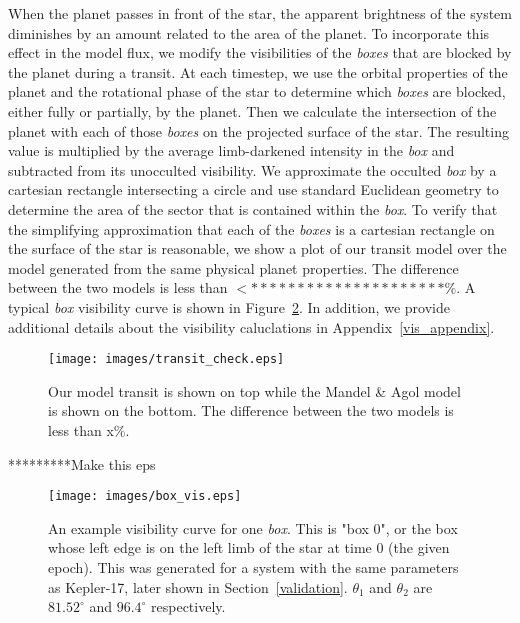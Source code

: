When the planet passes in front of the star, the apparent brightness of the system diminishes by an amount related to the area of the planet. To incorporate this effect in the model flux, we modify the visibilities of the {\it boxes} that are blocked by the planet during a transit. At each timestep, we use the orbital properties of the planet and the rotational phase of the star to determine which {\it boxes} are blocked, either fully or partially, by the planet. Then we calculate the intersection of the planet with each of those {\it boxes} on the projected surface of the star. The resulting value is multiplied by the average limb-darkened intensity in the {\it box} and subtracted from its unocculted visibility. We approximate the occulted {\it box} by a cartesian rectangle intersecting a circle and use standard Euclidean geometry to determine the area of the sector that is contained within the {\it box}. To verify that the simplifying approximation that each of the {\it boxes} is a cartesian rectangle on the surface of the star is reasonable, we show a plot of our transit model over the \citet{MandelAgol2002} model generated from the same physical planet properties. The difference between the two models is less than $<*********************\%$. A typical {\it box} visibility curve is shown in Figure~\ref{box_vis}. In addition, we provide additional details about the visibility caluclations in Appendix~\ref{vis_appendix}. 


\begin{figure}[h]
	\centering
	\texttt{[image: images/transit\_check.eps]}
	\caption{Our model transit is shown on top while the Mandel \& Agol model is shown on the bottom. The difference between the two models is less than x\%.}
	\label{transit}
\end{figure}
*********Make this eps
\begin{figure}[h]
	\centering
	\texttt{[image: images/box\_vis.eps]}
	\caption{An example visibility curve for one {\it box}. This is "box 0", or the box whose left edge is on the left limb of the star at time 0 (the given epoch). This was generated for a system with the same parameters as Kepler-17, later shown in Section~\ref{validation}. $\theta_1$ and $\theta_2$ are $81.52^\circ$ and $96.4^\circ$ respectively.}
	\label{box_vis}
\end{figure}